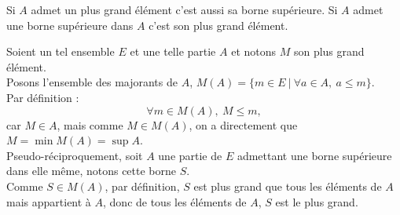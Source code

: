 \documentclass{article}
\begin{document}
\begin{question_kholle}
  [\noindent Soit $(E, \leq)$ un ensemble ordonné, et $A$ une partie non-vide de $E$. \\
    Si $A$ admet un plus grand élément alors $A$ admet une borne supérieure et $\sup{A} = \max{A}$. \\
    Si $A$ admet une borne supérieure appartenant à elle-même alors $A$ admet un plus grand élément et $\max{A} = \sup{A}$.]
  {Si $A$ admet un plus grand élément c'est aussi sa borne supérieure. Si $A$ admet une borne supérieure dans $A$ c'est son plus grand élément.}

  Soient un tel ensemble $E$ et une telle partie $A$ et notons $M$ son plus grand élément. \\
  Posons l'ensemble des majorants de $A$, $M(A) = \{ m\in E \ | \ \forall a \in A, \ a \leq m\}$. \\
  Par définition :
  \[
    \forall m \in M(A), \ M \leq m,
  \]
  car $M\in A$, mais comme $M\in M(A)$, on a directement que $M = \min{M(A)} = \sup{A}$. \\

  Pseudo-réciproquement, soit $A$ une partie de $E$ admettant une borne supérieure dans elle même, notons cette borne $S$. \\
  Comme $S \in M(A)$, par définition, $S$ est plus grand que tous les éléments de $A$ mais appartient à $A$, donc de tous les éléments de $A$, $S$ est le plus grand.
\end{question_kholle}
\end{document}
